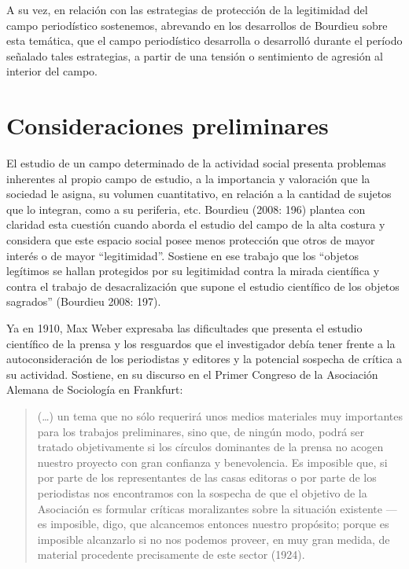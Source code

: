 A su vez, en relación con las estrategias de protección de la legitimidad del campo periodístico sostenemos, abrevando en los desarrollos de Bourdieu sobre esta temática, que el campo periodístico desarrolla o desarrolló durante el período señalado tales estrategias, a partir de una tensión o sentimiento de agresión al interior del campo.


\section{Consideraciones preliminares}

El estudio de un campo determinado de la actividad social presenta problemas inherentes al propio campo de estudio, a la importancia y valoración que la sociedad le asigna, su volumen cuantitativo, en relación a la cantidad de sujetos que lo integran, como a su periferia, etc. Bourdieu (2008: 196) plantea con claridad esta cuestión cuando aborda el estudio del campo de la alta costura y considera que este espacio social posee menos protección que otros de mayor interés o de mayor ``legitimidad''. Sostiene en ese trabajo que los ``objetos legítimos se hallan protegidos por su legitimidad contra la mirada científica y contra el trabajo de desacralización que supone el estudio científico de los objetos sagrados'' (Bourdieu 2008: 197).

Ya en 1910, Max Weber expresaba las dificultades que presenta el estudio científico de la prensa y los resguardos que el investigador debía tener frente a la autoconsideración de los periodistas y editores y la potencial sospecha de crítica a su actividad. Sostiene, en su discurso en el Primer Congreso de la Asociación Alemana de Sociología en Frankfurt:

\begin{quote}
(\ldots) un tema que no sólo requerirá unos medios materiales muy importantes para los trabajos preliminares, sino que, de ningún modo, podrá ser tratado objetivamente si los círculos dominantes de la prensa no acogen nuestro proyecto con gran confianza y benevolencia. Es imposible que, si por parte de los representantes de las casas editoras o por parte de los periodistas nos encontramos con la sospecha de que el objetivo de la Asociación es formular críticas moralizantes sobre la situación existente ---es imposible, digo, que alcancemos entonces nuestro propósito; porque es imposible alcanzarlo si no nos podemos proveer, en muy gran medida, de material procedente precisamente de este sector (1924).
\end{quote}


